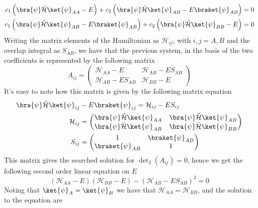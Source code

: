 \documentclass[a4paper, 11pt]{book}
\newcommand{\1}{\opr{\mathds{1}}}
\newcommand{\ham}{\mathcal{H}}
\newcommand{\opr}[1]{\hat{#1}}
\theoremstyle{plain}
\begin{document}
	\begin{equation}
		\begin{aligned}
			c_1\left( \bra{\psi}\opr{\ham}\ket{\psi}_{AA}-E \right)+c_2\left( \bra{\psi}\opr{\ham}\ket{\psi}_{AB}-E\braket{\psi}_{AB} \right)&=0\\
			c_1\left( \bra{\psi}\opr{\ham}\ket{\psi}_{AB}-E\braket{\psi}_{AB} \right)+c_2\left( \bra{\psi}\opr{\ham}\ket{\psi}_{BB}-E \right)&=0
		\end{aligned}
		\label{eq:finalconditionmatrix}
	\end{equation}
	Writing the matrix elements of the Hamiltonian as $\mathcal{H}_{ij}$, with $i,j=A,B$ and the overlap integral as $S_{AB}$, we have that the previous system, in the basis of the two coefficients is represented by the following matrix
	\begin{equation*}
		A_{ij}=\begin{pmatrix}
			\mathcal{H}_{AA}-E&\mathcal{H}_{AB}-ES_{AB}\\
			\mathcal{H}_{AB}-ES_{AB}&\mathcal{H}_{BB}-E
		\end{pmatrix}
	\end{equation*}
	It's easy to note how this matrix is given by the following matrix equation
	\begin{equation*}
		\begin{aligned}
			\bra{\psi}\opr{\ham}\ket{\psi}_{ij}&-E\braket{\psi}_{ij}=\mathcal{H}_{ij}-ES_{ij}\\
			\mathcal{H}_{ij}&=\begin{pmatrix}
				\bra{\psi}\opr{\ham}\ket{\psi}_{AA}&\bra{\psi}\opr{\ham}\ket{\psi}_{AB}\\
				\bra{\psi}\opr{\ham}\ket{\psi}_{AB}&\bra{\psi}\opr{\ham}\ket{\psi}_{BB}
			\end{pmatrix}\\
			S_{ij}&=\begin{pmatrix}
				1&\braket{\psi}_{AB}\\
				\braket{\psi}_{AB}&1
			\end{pmatrix}
		\end{aligned}
	\end{equation*}
	This matrix gives the searched solution for $\det_2(A_{ij})=0$, hence we get the following second order linear equation on $E$
	\begin{equation*}
		\left( \mathcal{H}_{AA}-E \right)\left( \mathcal{H}_{BB}-E \right)-\left( \mathcal{H}_{AB}-ES_{AB} \right)^2=0
	\end{equation*}
	Noting that $\ket{\psi}_A=\ket{\psi}_B$ we have that $\mathcal{H}_{AA}=\mathcal{H}_{BB}$, and the solution to the equation are
\end{document}
